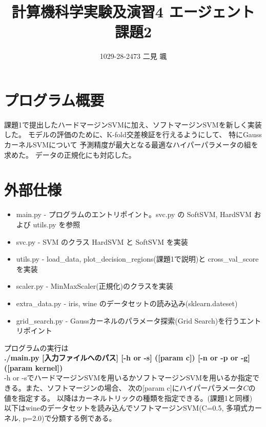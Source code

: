 \documentclass{jsarticle}
\begin{document}
\title{計算機科学実験及演習4 エージェント 課題2}
\author{1029-28-2473 二見 颯}
\maketitle

\section{プログラム概要}
課題1で提出したハードマージンSVMに加え、ソフトマージンSVMを新しく実装した。
モデルの評価のために、K-fold交差検証を行えるようにして、
特にGaussカーネルSVMについて
予測精度が最大となる最適なハイパーパラメータの組を求めた。
データの正規化にも対応した。

\section{外部仕様}
\begin{itemize}
    \item main.py - プログラムのエントリポイント。svc.py の SoftSVM, HardSVM および utils.py を参照
    \item svc.py - SVM のクラス HardSVM と SoftSVM を実装
    \item utils.py - load\_data, plot\_decision\_regions(課題1で説明)と cross\_val\_score を実装
    \item scaler.py - MinMaxScaler(正規化)のクラスを実装
    \item extra\_data.py - iris, wine のデータセットの読み込み(sklearn.dateset)
    \item grid\_search.py - Gaussカーネルのパラメータ探索(Grid Search)を行うエントリポイント
\end{itemize}
プログラムの実行は \\
{\bf ./main.py [入力ファイルへのパス] [-h or -s] ([param c]) [-n or -p or -g] ([param kernel])} \\ 
-h or -sでハードマージンSVMを用いるかソフトマージンSVMを用いるか指定できる。また、ソフトマージンの場合、
次の[param c]にハイパーパラメータ$C$の値を指定する。
以降はカーネルトリックの種類を指定できる。(課題1と同様) \\
以下はwineのデータセットを読み込んでソフトマージンSVM(C=0.5, 多項式カーネル, p=2.0)で分類する例である。
\end{document}
